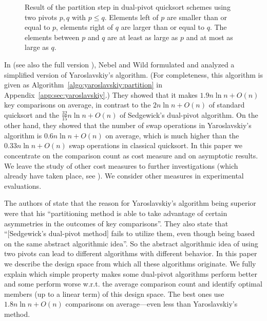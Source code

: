\documentclass[prodmode,acmtalg]{acmsmall}
\begin{document}
\begin{figure}[tb]
    \centering
    \caption{Result of the partition step in dual-pivot quicksort schemes using
    two pivots $p,q$ with $p \leq q$. Elements left of $p$ are smaller than or equal to $p$, 
    elements right of $q$ are larger than or equal to $q$. The elements between $p$ and $q$
    are at least as large as $p$ and at most as large as $q$.}
    \label{fig:dual:pivot:partition}
\end{figure}

In \cite{nebel12} (see also the full version \cite{WildNN15}), Nebel and Wild
formulated and analyzed a simplified version
of Yaroslavskiy's algorithm. (For completeness, this algorithm is given as
Algorithm~\ref{algo:yaroslavskiy:partition} in
Appendix~\ref{app:sec:yaroslavskiy}.) They showed that it makes $1.9n \ln n +
O(n)$ key comparisons on average, in contrast to the $2n\ln n+O(n)$ of standard
quicksort and the $\frac{32}{15}n \ln n + O(n)$ of Sedgewick's dual-pivot
algorithm. On the other hand, they showed that the number of swap operations in
Yaroslavskiy's algorithm  is $0.6n \ln n + O(n)$ on average, which is much
higher than the $0.33 n\ln n + O(n)$ swap operations in classical quicksort.  In
this paper we concentrate on the comparison count as
cost measure and on asymptotic results. We leave the study of other cost measures
to further investigations (which already have taken place, see \cite{MartinezNW15}).
We consider other measures in experimental evaluations.

The authors of \cite{nebel12} state that the reason for Yaroslavskiy's algorithm
being superior were that his ``partitioning method is able to take advantage of
certain asymmetries in the
outcomes of key comparisons''. They also state that ``[Sedgewick's dual-pivot method] fails to utilize them, even though
being based on the same abstract algorithmic idea''.  
So the abstract algorithmic idea of using two pivots can lead to different algorithms with different behavior. 
In this paper we describe the design space from which all these algorithms originate.
We fully explain which simple property makes some dual-pivot algorithms perform
better and some perform worse w.r.t. the average comparison count
and identify optimal members (up to a linear term) of this design
space. The best ones use $1.8n \ln n
+ O(n)$ comparisons on average---even less than Yaroslavskiy's
method.
\end{document}
